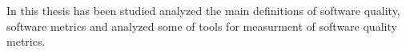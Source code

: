 In this thesis has been studied analyzed the main definitions of software quality, software metrics and analyzed some of tools for measurment of software quality metrics.